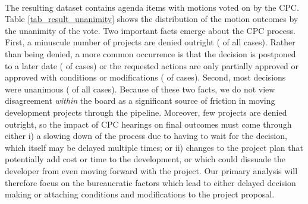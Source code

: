 ~

\noindent The resulting dataset contains  agenda items with motions voted on by the CPC. Table \ref{tab_result_unanimity} shows the distribution of the motion outcomes by the unanimity of the vote. Two important facts emerge about the CPC process. First, a minuscule number of projects are denied outright ( of all cases). Rather than being denied, a more common occurrence is that the decision is postponed to a later date ( of cases) or the requested actions are only partially approved or approved with conditions or modifications ( of cases). Second, most decisions were unanimous ( of all cases). Because of these two facts, we do not view disagreement \emph{within} the board as a significant source of friction in moving development projects through the pipeline. Moreover, few projects are denied outright, so the impact of CPC hearings on final outcomes must come through either i) a slowing down of the process due to having to wait for the decision, which itself may be delayed multiple times; or ii) changes to the project plan that potentially add cost or time to the development, or which could  dissuade the developer from even moving forward with the project. Our primary analysis will therefore focus on the bureaucratic factors which lead to either delayed decision making or attaching conditions and modifications to the project proposal.


